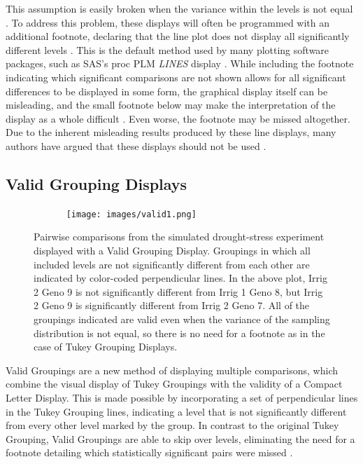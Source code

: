 \documentclass{article}
\begin{document}
This assumption is easily broken when the variance within the levels is not equal \cite{dontUseBars, CLDVsLines, procPLM}. To address this problem, these displays will often be programmed with an additional footnote, declaring that the line plot does not display all significantly different levels \cite{procPLM}. This is the default method used by many plotting software packages, such as SAS's proc PLM \emph{LINES} display \cite{procPLM}. While including the footnote indicating which significant comparisons are not shown allows for all significant differences to be displayed in some form, the graphical display itself can be misleading, and the small footnote below may make the interpretation of the display as a whole difficult \cite{dontUseBars, CLDVsLines, procPLM}. Even worse, the footnote may be missed altogether. Due to the inherent misleading results produced by these line displays, many authors have argued that these displays should not be used \cite{dontUseBars, CLDVsLines}. 

\subsection{Valid Grouping Displays}

\begin{figure}[H]
    \centering
    \texttt{[image: images/valid1.png]}
   \label{fig:compute}
    \caption{Pairwise comparisons from the simulated drought-stress experiment displayed with a Valid Grouping Display. Groupings in which all included levels are not significantly different from each other are indicated by color-coded perpendicular lines. In the above plot, Irrig 2 Geno 9 is not significantly different from Irrig 1 Geno 8, but Irrig 2 Geno 9 is significantly different from Irrig 2 Geno 7. All of the groupings indicated are valid even when the variance of the sampling distribution is not equal, so there is no need for a footnote as in the case of Tukey Grouping Displays.}
\end{figure}

Valid Groupings are a new method of displaying multiple comparisons, which combine the visual display of Tukey Groupings with the validity of a Compact Letter Display. This is made possible by incorporating a set of perpendicular lines in the Tukey Grouping lines, indicating a level that is not significantly different from every other level marked by the group. In contrast to the original Tukey Grouping, Valid Groupings are able to skip over levels, eliminating the need for a footnote detailing which statistically significant pairs were missed \cite{dontUseBars, CLDVsLines, procPLM}. 
\end{document}
